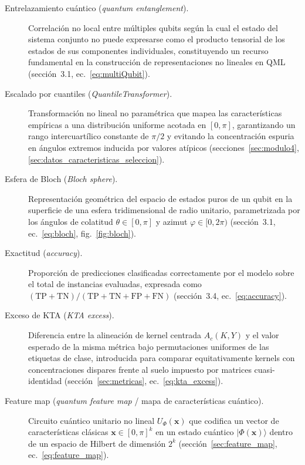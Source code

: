 \begin{description}
  \item[Entrelazamiento cuántico (\textit{quantum entanglement}).] Correlación no local entre múltiples qubits según la cual el estado del sistema conjunto no puede expresarse como el producto tensorial de los estados de sus componentes individuales, constituyendo un recurso fundamental en la construcción de representaciones no lineales en QML (sección~3.1, ec.~\ref{eq:multiQubit}).

  \item[Escalado por cuantiles (\textit{QuantileTransformer}).] Transformación no lineal no paramétrica que mapea las características empíricas a una distribución uniforme acotada en $[0, \pi]$, garantizando un rango intercuartílico constante de $\pi/2$ y evitando la concentración espuria en ángulos extremos inducida por valores atípicos (secciones~\ref{sec:modulo4}, \ref{sec:datos_caracteristicas_seleccion}).

  \item[Esfera de Bloch (\textit{Bloch sphere}).] Representación geométrica del espacio de estados puros de un qubit en la superficie de una esfera tridimensional de radio unitario, parametrizada por los ángulos de colatitud $\theta \in [0, \pi]$ y azimut $\varphi \in [0, 2\pi)$ (sección~3.1, ec.~\ref{eq:bloch}, fig.~\ref{fig:bloch}).

  \item[Exactitud (\textit{accuracy}).] Proporción de predicciones clasificadas correctamente por el modelo sobre el total de instancias evaluadas, expresada como $(\mathrm{TP} + \mathrm{TN}) / (\mathrm{TP} + \mathrm{TN} + \mathrm{FP} + \mathrm{FN})$ (sección~3.4, ec.~\ref{eq:accuracy}).

  \item[Exceso de KTA (\textit{KTA excess}).] Diferencia entre la alineación de kernel centrada $A_c(K, Y)$ y el valor esperado de la misma métrica bajo permutaciones uniformes de las etiquetas de clase, introducida para comparar equitativamente kernels con concentraciones dispares frente al suelo impuesto por matrices cuasi-identidad (sección~\ref{sec:metricas}, ec.~\ref{eq:kta_excess}).

  \item[Feature map (\textit{quantum feature map} / mapa de características cuántico).] Circuito cuántico unitario no lineal $U_\Phi(\mathbf{x})$ que codifica un vector de características clásicas $\mathbf{x} \in [0, \pi]^k$ en un estado cuántico $|\Phi(\mathbf{x})\rangle$ dentro de un espacio de Hilbert de dimensión $2^k$ (sección~\ref{sec:feature_map}, ec.~\ref{eq:feature_map}).


\end{description}

